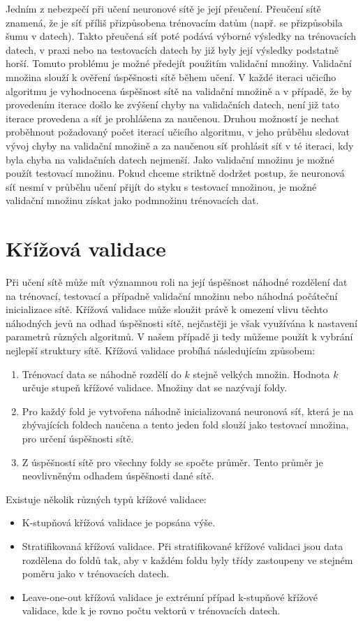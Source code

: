 \documentclass[11pt,twoside,a4paper]{book}
\begin{document}
Jedním z nebezpečí při učení neuronové sítě je její přeučení. Přeučení sítě znamená, že je síť příliš přizpůsobena trénovacím datům (např. se přizpůsobila šumu v datech). Takto přeučená síť poté podává výborné výsledky na trénovacích datech, v praxi nebo na testovacích datech by již byly její výsledky podstatně horší. Tomuto problému je možné předejít použitím validační množiny. Validační množina slouží k ověření úspěšnosti sítě během učení. V každé iteraci učicího algoritmu je vyhodnocena úspěšnost sítě na validační množině a v případě, že by provedením iterace došlo ke zvýšení chyby na validačních datech, není již tato iterace provedena a síť je prohlášena za naučenou. Druhou možností je nechat proběhnout požadovaný počet iterací učicího algoritmu, v jeho průběhu sledovat vývoj chyby na validační množině a za naučenou síť prohlásit síť v té iteraci, kdy byla chyba na validačních datech nejmenší.
Jako validační množinu je možné použít testovací množinu. Pokud chceme striktně dodržet postup, že neuronová síť nesmí v průběhu učení přijít do styku s testovací množinou, je možné validační množinu získat jako podmnožinu trénovacích dat.
\section{Křížová validace}
Při učení sítě může mít významnou roli na její úspěšnost náhodné rozdělení dat na trénovací, testovací a případně validační množinu nebo náhodná počáteční inicializace sítě.
Křížová validace může sloužit právě k omezení vlivu těchto náhodných jevů na odhad úspěšnosti sítě, nejčastěji je však využívána k nastavení parametrů různých algoritmů. V našem případě ji tedy můžeme použít k vybrání nejlepší struktury sítě. Křížová validace probíhá následujícím způsobem:
\begin{enumerate}
\item Trénovací data se náhodně rozdělí do $k$ stejně velkých množin. Hodnota $k$ určuje stupeň křížové validace. Množiny dat se nazývají foldy.
\item Pro každý fold je vytvořena náhodně inicializovaná neuronová síť, která je na zbývajících foldech naučena a tento jeden fold slouží jako testovací množina, pro určení úspěšnosti sítě.
\item Z úspěšností sítě pro všechny foldy se spočte průměr. Tento průměr je neovlivněným odhadem úspěšnosti dané sítě.
\end{enumerate}
Existuje několik různých typů křížové validace:
\begin{itemize}
\item K-stupňová křížová validace je popsána výše.
\item Stratifikovaná křížová validace. Při stratifikované křížové validaci jsou data rozdělena do foldů tak, aby v každém foldu byly třídy zastoupeny ve stejném poměru jako v trénovacích datech.
\item Leave-one-out křížová validace je extrémní případ k-stupňové křížové validace, kde k je rovno počtu vektorů v trénovacích datech.
\end{itemize}
\end{document}
